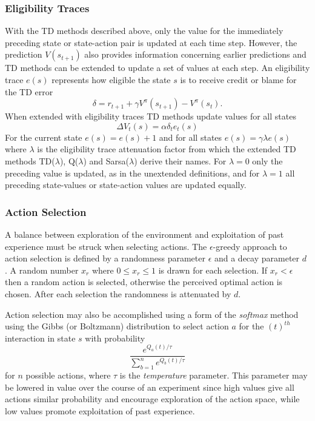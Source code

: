 \subsubsection{Eligibility Traces}
\label{sec:eligibility}
With the TD methods described above, only the value for the immediately
preceding state or state-action pair is updated at each time step.  However, the
prediction $V(s_{t+1})$ also provides information concerning earlier predictions
and TD methods can be extended to update a set of values at each step.  An
eligibility trace $e(s)$ \cite{tanner:2005} represents how eligible the state
$s$ is to receive credit or blame for the TD error
\begin{equation}
\delta = r_{t+1} + \gamma V^\pi(s_{t+1}) - V^\pi(s_t).
\end{equation}
When extended with eligibility traces TD methods update values for all states
\begin{equation}
\Delta V_t(s) = \alpha \delta_t e_t(s)
\end{equation}
For the current state $e(s) = e(s) + 1$ and for all states
$e(s) = \gamma \lambda e(s)$ where $\lambda$ is the eligibility trace
attenuation factor from which the extended TD methods TD($\lambda$),
Q($\lambda$) and Sarsa($\lambda$) derive their names. For $\lambda = 0$ only
the preceding value is updated, as in the unextended definitions,
and for $\lambda = 1$ all preceding state-values or state-action values are
updated equally.

\subsubsection{Action Selection}
\label{sec:actionselection}
A balance between exploration of the environment and exploitation of past
experience must be struck when selecting actions.  The $\epsilon$-greedy
approach to action selection is defined by a randomness parameter $\epsilon$ and
a decay parameter $d$ \cite{rivest:1990}.  A random number $x_r$ where $0 \leq
x_r \leq 1$ is drawn for each selection.  If $x_r < \epsilon$ then a random
action is selected, otherwise the perceived optimal action is chosen. After each
selection the randomness is attenuated by $d$.

Action selection may also be accomplished using a form of the \textit{softmax}
method \cite[\S2]{suttonbarto:1998} using the Gibbs (or
Boltzmann) distribution to select action $a$ for the $(t)^{th}$ interaction in
state $s$ with probability
\begin{equation}
\frac{e^{Q_{a}(t)/\tau}}{\sum_{b=1}^n e^{Q_{b}(t)/\tau}}
\end{equation}
for $n$ possible actions, where $\tau$ is the \textit{temperature} parameter.
This parameter may be lowered in value over the course of an experiment since
high values give all actions similar probability and encourage exploration of
the action space, while low values promote exploitation of past experience.

